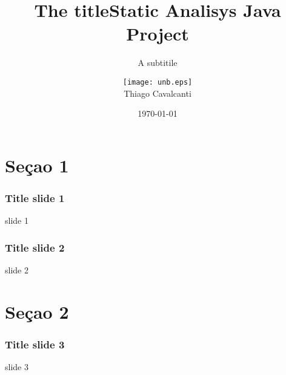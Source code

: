 \documentclass{beamer}
\title{The title}
\author[T.Cavalcanti]{\texttt{[image: unb.eps]}\\Thiago Cavalcanti}
\institute[UnB]{Universidade De Brasília - UnB}
\title{Static Analisys Java Project}
\subtitle[short version]{A subtitile}
\date{\today}
\begin{document}
	\frame{\maketitle}			
	\begin{frame}
		\tableofcontents
	\end{frame}
		
	\section{Seçao 1}
		\begin{frame}
			\frametitle{Title slide 1}
			slide 1
		\end{frame}
	
		\begin{frame}
			\frametitle{Title slide 2}
			slide 2
		\end{frame}
		
	\section{Seçao 2}	
		\begin{frame}
			\frametitle{Title slide 3}
			slide 3
		\end{frame}
	
\end{document}
